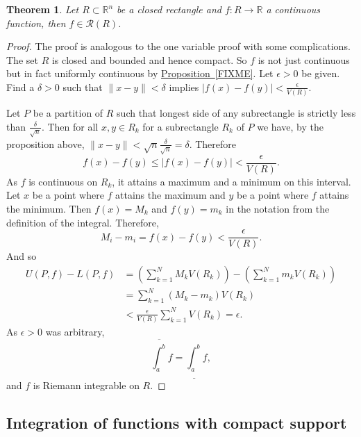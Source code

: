 \documentclass[12pt]{book}
\newcommand{\snorm}[1]{\lVert {#1} \rVert}
\newcommand{\abs}[1]{\left\lvert {#1} \right\rvert}
\newcommand{\R}{{\mathbb{R}}}
\newcommand{\sR}{{\mathcal{R}}}
\theoremstyle{plain}
\newtheorem{thm}{Theorem}[section]
\theoremstyle{remark}
\theoremstyle{definition}
\theoremstyle{exercise}
\theoremstyle{example}
\newcommand{\propref}[1]{\hyperref[#1]{Proposition~\ref*{#1}}}
\begin{document}
\begin{thm} \label{mv:thm:contintrect}
Let $R \subset \R^n$ be a closed rectangle and
$f \colon R \to \R$ a continuous function,
then $f \in \sR(R)$.
\end{thm}

\begin{proof}
The proof is analogous to the one variable proof with some complications.
The set $R$ is closed and bounded and hence compact.  So
$f$ is not just continuous but in fact uniformly continuous 
by \propref{FIXME}.
Let $\epsilon > 0$ be given.  Find a $\delta > 0$ such that
$\snorm{x-y} < \delta$ implies $\abs{f(x)-f(y)} < \frac{\epsilon}{V(R)}$.

Let $P$ be a partition of $R$ such that longest side of any subrectangle
is strictly less than $\frac{\delta}{\sqrt{n}}$.
Then for all $x, y \in R_k$ for a subrectangle $R_k$ of $P$ we have,
by the proposition above,
$\snorm{x-y} < \sqrt{n} \frac{\delta}{\sqrt{n}} = \delta$.  Therefore
\begin{equation*}
f(x)-f(y) \leq \abs{f(x)-f(y)} < \frac{\epsilon}{V(R)} .
\end{equation*}
As $f$ is continuous on $R_k$, it attains a maximum and a minimum
on this interval.
Let $x$ be a point where $f$ attains the maximum and $y$ be a point
where $f$ attains the minimum.  Then $f(x) = M_k$
and $f(y) = m_k$ in the notation from the definition of the integral.
Therefore,
\begin{equation*}
M_i-m_i = f(x)-f(y) < 
\frac{\epsilon}{V(R)} .
\end{equation*}
And so
\begin{equation*}
\begin{split}
U(P,f) - L(P,f)
& =
\left(
\sum_{k=1}^N
M_k V(R_k)
\right)
-
\left(
\sum_{k=1}^N
m_k V(R_k)
\right)
\\
& =
\sum_{k=1}^N
(M_k-m_k) V(R_k)
\\
& <
\frac{\epsilon}{V(R)}
\sum_{k=1}^N
V(R_k)
= \epsilon.
\end{split}
\end{equation*}
As $\epsilon > 0$ was arbitrary,
\begin{equation*}
\overline{\int_a^b} f = \underline{\int_a^b} f ,
\end{equation*}
and $f$ is Riemann integrable on $R$.
\end{proof}

\subsection{Integration of functions with compact support}
\end{document}
